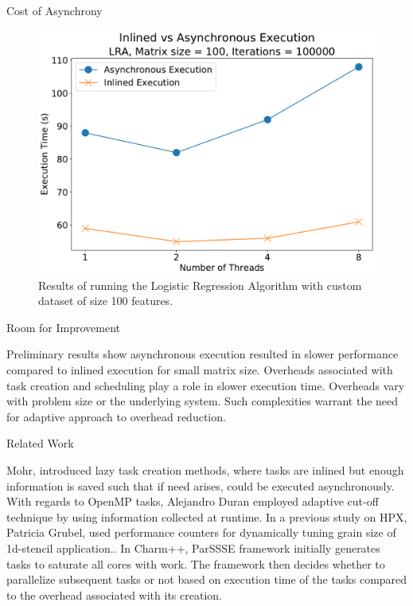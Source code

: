 \documentclass[10pt]{beamer}
\begin{document}
\begin{frame}{Cost of Asynchrony}
\begin{figure}
	\centering
	\includegraphics[width=0.8\linewidth]{figures/direct_nondir.pdf}
	\par\caption{Results of running the Logistic Regression Algorithm with custom dataset of size 100 features.}
	\label{dir_nondir}
\end{figure}
\end{frame}

\begin{frame}{Room for Improvement}
\begin{outline}
	\1 Preliminary results show  asynchronous execution resulted in slower performance compared to inlined execution for small matrix size. 
	\1 Overheads associated with task creation and scheduling play a role in slower execution time. 
	\1 Overheads vary with problem size or the underlying system.
	\1 Such complexities warrant the need for adaptive approach to overhead reduction.
\end{outline}
\end{frame}

\begin{frame}{Related Work}
\begin{outline}
	\1 Mohr, introduced lazy task creation methods, where tasks are inlined but enough information is saved such that if need arises, could be executed asynchronously. 
	\1 With regards to OpenMP tasks, Alejandro Duran  employed  adaptive cut-off technique by using information collected at runtime.
	\1 In a previous study on HPX, Patricia Grubel, used performance counters for dynamically tuning grain size of 1d-stencil application..  
	\1 In Charm++, ParSSSE framework initially generates tasks to saturate all cores with work. The framework then decides whether to parallelize subsequent tasks or not based on execution time of the tasks compared to the overhead associated with its creation. 
\end{outline}
\end{frame}
\end{document}
